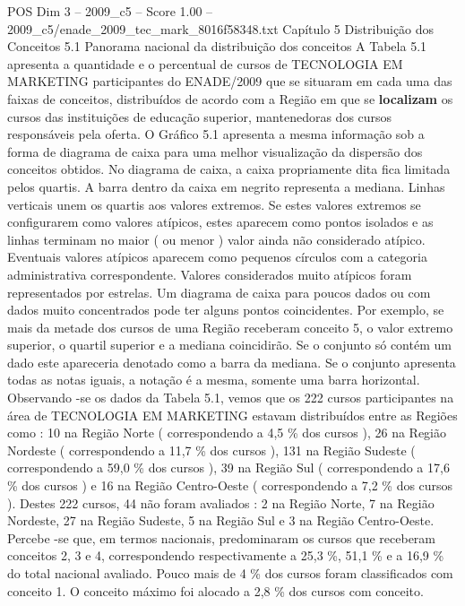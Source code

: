 \begin{textsample}{POS Dim 3 – 2009\_c5 – Score 1.00 – 2009\_c5/enade\_2009\_tec\_mark\_8016f58348.txt}  \label{ex:f3_pos_134}
Capítulo 5 Distribuição dos Conceitos 5.1 Panorama nacional da distribuição dos conceitos A Tabela 5.1 apresenta a quantidade e o percentual de cursos de TECNOLOGIA EM MARKETING participantes do ENADE/2009 que se situaram em cada uma das faixas de conceitos, distribuídos de acordo com a Região em que se \textbf{localizam} os cursos das instituições de educação superior, mantenedoras dos cursos responsáveis pela oferta.
O Gráfico 5.1 apresenta a mesma informação sob a forma de diagrama de caixa para uma melhor visualização da dispersão dos conceitos obtidos.
No diagrama de caixa, a caixa propriamente dita fica limitada pelos quartis.
A barra dentro da caixa em negrito representa a mediana.
Linhas verticais unem os quartis aos valores extremos.
Se estes valores extremos se configurarem como valores atípicos, estes aparecem como pontos isolados e as linhas terminam no maior ( ou menor ) valor ainda não considerado atípico.
Eventuais valores atípicos aparecem como pequenos círculos com a categoria administrativa correspondente.
Valores considerados muito atípicos foram representados por estrelas.
Um diagrama de caixa para poucos dados ou com dados muito concentrados pode ter alguns pontos coincidentes.
Por exemplo, se mais da metade dos cursos de uma Região receberam conceito 5, o valor extremo superior, o quartil superior e a mediana coincidirão.
Se o conjunto só contém um dado este apareceria denotado como a barra da mediana.
Se o conjunto apresenta todas as notas iguais, a notação é a mesma, somente uma barra horizontal.
Observando -se os dados da Tabela 5.1, vemos que os 222 cursos participantes na área de TECNOLOGIA EM MARKETING estavam distribuídos entre as Regiões como : 10 na Região Norte ( correspondendo a 4,5 \% dos cursos ), 26 na Região Nordeste ( correspondendo a 11,7 \% dos cursos ), 131 na Região Sudeste ( correspondendo a 59,0 \% dos cursos ), 39 na Região Sul ( correspondendo a 17,6 \% dos cursos ) e 16 na Região Centro-Oeste ( correspondendo a 7,2 \% dos cursos ).
Destes 222 cursos, 44 não foram avaliados : 2 na Região Norte, 7 na Região Nordeste, 27 na Região Sudeste, 5 na Região Sul e 3 na Região Centro-Oeste.
Percebe -se que, em termos nacionais, predominaram os cursos que receberam conceitos 2, 3 e 4, correspondendo respectivamente a 25,3 \%, 51,1 \% e a 16,9 \% do total nacional avaliado.
Pouco mais de 4 \% dos cursos foram classificados com conceito 1.
O conceito máximo foi alocado a 2,8 \% dos cursos com conceito.

\end{textsample}
